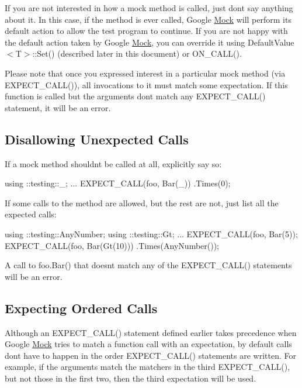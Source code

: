 If you are not interested in how a mock method is called, just don\textquotesingle{}t say anything about it. In this case, if the method is ever called, Google \hyperlink{class_mock}{Mock} will perform its default action to allow the test program to continue. If you are not happy with the default action taken by Google \hyperlink{class_mock}{Mock}, you can override it using {\ttfamily Default\+Value$<$T$>$\+::\+Set()} (described later in this document) or {\ttfamily O\+N\+\_\+\+C\+A\+L\+L()}.

Please note that once you expressed interest in a particular mock method (via {\ttfamily E\+X\+P\+E\+C\+T\+\_\+\+C\+A\+L\+L()}), all invocations to it must match some expectation. If this function is called but the arguments don\textquotesingle{}t match any {\ttfamily E\+X\+P\+E\+C\+T\+\_\+\+C\+A\+L\+L()} statement, it will be an error.

\subsection*{Disallowing Unexpected Calls}

If a mock method shouldn\textquotesingle{}t be called at all, explicitly say so\+:


\begin{DoxyCode}
using ::testing::\_;
...
  EXPECT\_CALL(foo, Bar(\_))
      .Times(0);
\end{DoxyCode}


If some calls to the method are allowed, but the rest are not, just list all the expected calls\+:


\begin{DoxyCode}
using ::testing::AnyNumber;
using ::testing::Gt;
...
  EXPECT\_CALL(foo, Bar(5));
  EXPECT\_CALL(foo, Bar(Gt(10)))
      .Times(AnyNumber());
\end{DoxyCode}


A call to {\ttfamily foo.\+Bar()} that doesn\textquotesingle{}t match any of the {\ttfamily E\+X\+P\+E\+C\+T\+\_\+\+C\+A\+L\+L()} statements will be an error.

\subsection*{Expecting Ordered Calls}

Although an {\ttfamily E\+X\+P\+E\+C\+T\+\_\+\+C\+A\+L\+L()} statement defined earlier takes precedence when Google \hyperlink{class_mock}{Mock} tries to match a function call with an expectation, by default calls don\textquotesingle{}t have to happen in the order {\ttfamily E\+X\+P\+E\+C\+T\+\_\+\+C\+A\+L\+L()} statements are written. For example, if the arguments match the matchers in the third {\ttfamily E\+X\+P\+E\+C\+T\+\_\+\+C\+A\+L\+L()}, but not those in the first two, then the third expectation will be used.

